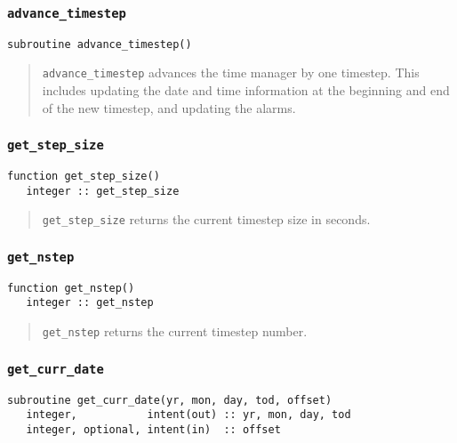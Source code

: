 \documentclass[12pt]{article}
\newcommand{\code}[1]{\texttt{#1}}
\begin{document}
\subsubsection{\code{advance\_timestep}}
\begin{verbatim}
subroutine advance_timestep()
\end{verbatim}

\begin{quote}
\code{advance\_timestep} advances the time manager by one timestep.  This
includes updating the date and time information at the beginning and end of
the new timestep, and updating the alarms.
\end{quote}

\subsubsection{\code{get\_step\_size}}
\begin{verbatim}
function get_step_size()
   integer :: get_step_size
\end{verbatim}

\begin{quote}
\code{get\_step\_size} returns the current timestep size in seconds.
\end{quote}

\subsubsection{\code{get\_nstep}}
\begin{verbatim}
function get_nstep()
   integer :: get_nstep
\end{verbatim}

\begin{quote}
\code{get\_nstep} returns the current timestep number.
\end{quote}

\subsubsection{\code{get\_curr\_date}}
\begin{verbatim}
subroutine get_curr_date(yr, mon, day, tod, offset)
   integer,           intent(out) :: yr, mon, day, tod
   integer, optional, intent(in)  :: offset
\end{verbatim}
\end{document}
